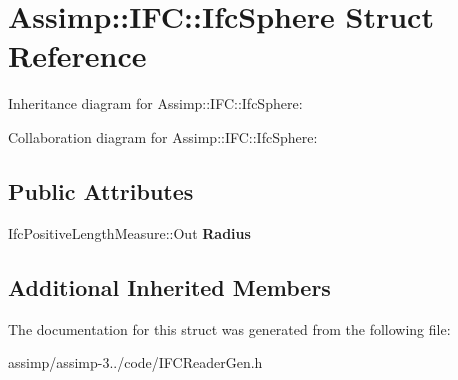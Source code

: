 \hypertarget{struct_assimp_1_1_i_f_c_1_1_ifc_sphere}{\section{Assimp\+:\+:I\+F\+C\+:\+:Ifc\+Sphere Struct Reference}
\label{struct_assimp_1_1_i_f_c_1_1_ifc_sphere}
}


Inheritance diagram for Assimp\+:\+:I\+F\+C\+:\+:Ifc\+Sphere\+:


Collaboration diagram for Assimp\+:\+:I\+F\+C\+:\+:Ifc\+Sphere\+:
\subsection*{Public Attributes}
\begin{DoxyCompactItemize}
\item 
\hypertarget{struct_assimp_1_1_i_f_c_1_1_ifc_sphere_a7489536c1f79cad00ce329746bba51e3}{Ifc\+Positive\+Length\+Measure\+::\+Out {\bfseries Radius}}\label{struct_assimp_1_1_i_f_c_1_1_ifc_sphere_a7489536c1f79cad00ce329746bba51e3}

\end{DoxyCompactItemize}
\subsection*{Additional Inherited Members}


The documentation for this struct was generated from the following file\+:\begin{DoxyCompactItemize}
\item 
assimp/assimp-\/3../code/I\+F\+C\+Reader\+Gen.\+h\end{DoxyCompactItemize}
